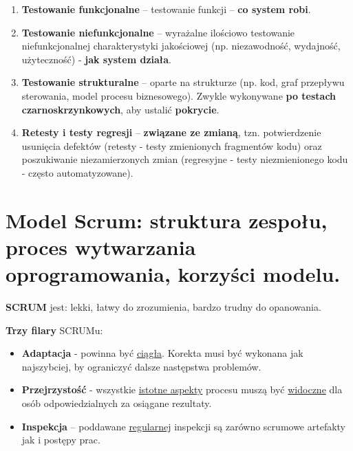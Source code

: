 \documentclass[main.tex]{subfiles}
\begin{document}
    \begin{enumerate}
        \item  \textbf{Testowanie funkcjonalne} -- testowanie funkcji -- \textbf{co system robi}.

        \item \textbf{Testowanie niefunkcjonalne} -- wyrażalne ilościowo testowanie niefunkcjonalnej charakterystyki
        jakościowej (np. niezawodność, wydajność, użyteczność) - \textbf{jak system działa}.

        \item \textbf{Testowanie strukturalne} -- oparte na strukturze (np. kod, graf przepływu sterowania, model procesu biznesowego).
        Zwykle wykonywane \textbf{po testach czarnoskrzynkowych}, aby ustalić \textbf{pokrycie}.

        \item \textbf{Retesty i testy regresji} -- \textbf{związane ze zmianą}, tzn. potwierdzenie usunięcia defektów
        (retesty - testy zmienionych fragmentów kodu) oraz poszukiwanie niezamierzonych zmian (regresyjne - testy
        niezmienionego kodu - często automatyzowane).
    \end{enumerate}


    \section{Model Scrum: struktura zespołu, proces wytwarzania oprogramowania, korzyści modelu.}
    \textbf{SCRUM} jest: lekki, łatwy do zrozumienia, bardzo trudny do opanowania.

    \noindent \textbf{Trzy filary} SCRUMu:
    \begin{itemize}[noitemsep]
        \item \textbf{Adaptacja} - powinna być \underline{ciągła}. Korekta musi być
        wykonana jak najszybciej, by ograniczyć dalsze następstwa problemów.
        \item \textbf{Przejrzystość} - wszystkie \underline{istotne aspekty} procesu
        muszą być \underline{widoczne} dla osób odpowiedzialnych za osiągane rezultaty.
        \item \textbf{Inspekcja} – poddawane \underline{regularnej} inspekcji są zarówno scrumowe
        artefakty jak i postępy prac.
    \end{itemize}
\end{document}
